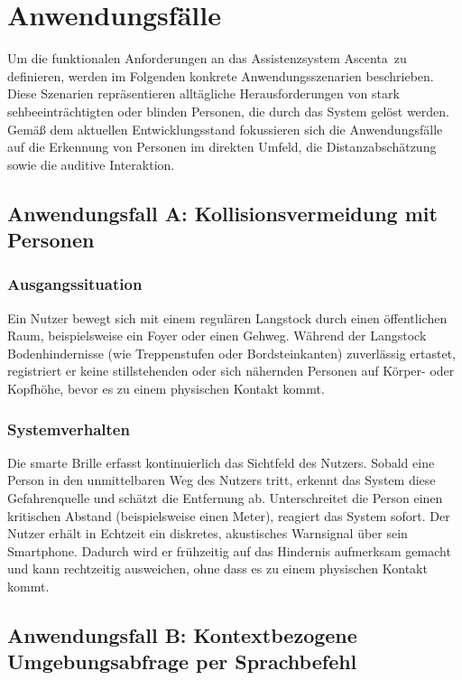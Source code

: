 
\chapter{Anwendungsfälle}
\label{ch:02_use_cases}

Um die funktionalen Anforderungen an das Assistenzsystem \glqq Ascenta\grqq\ zu definieren, werden im Folgenden konkrete Anwendungsszenarien beschrieben. Diese Szenarien repräsentieren alltägliche Herausforderungen von stark sehbeeinträchtigten oder blinden Personen, die durch das System gelöst werden. Gemäß dem aktuellen Entwicklungsstand fokussieren sich die Anwendungsfälle auf die Erkennung von Personen im direkten Umfeld, die Distanzabschätzung sowie die auditive Interaktion.

\section{Anwendungsfall A: Kollisionsvermeidung mit Personen}

\subsection{Ausgangssituation}
Ein Nutzer bewegt sich mit einem regulären Langstock durch einen öffentlichen Raum, beispielsweise ein Foyer oder einen Gehweg. Während der Langstock Bodenhindernisse (wie Treppenstufen oder Bordsteinkanten) zuverlässig ertastet, registriert er keine stillstehenden oder sich nähernden Personen auf Körper- oder Kopfhöhe, bevor es zu einem physischen Kontakt kommt.

\subsection{Systemverhalten}
Die smarte Brille erfasst kontinuierlich das Sichtfeld des Nutzers. Sobald eine Person in den unmittelbaren Weg des Nutzers tritt, erkennt das System diese Gefahrenquelle und schätzt die Entfernung ab. Unterschreitet die Person einen kritischen Abstand (beispielsweise einen Meter), reagiert das System sofort. Der Nutzer erhält in Echtzeit ein diskretes, akustisches Warnsignal über sein Smartphone. Dadurch wird er frühzeitig auf das Hindernis aufmerksam gemacht und kann rechtzeitig ausweichen, ohne dass es zu einem physischen Kontakt kommt.

\section{Anwendungsfall B: Kontextbezogene Umgebungsabfrage per Sprachbefehl}

